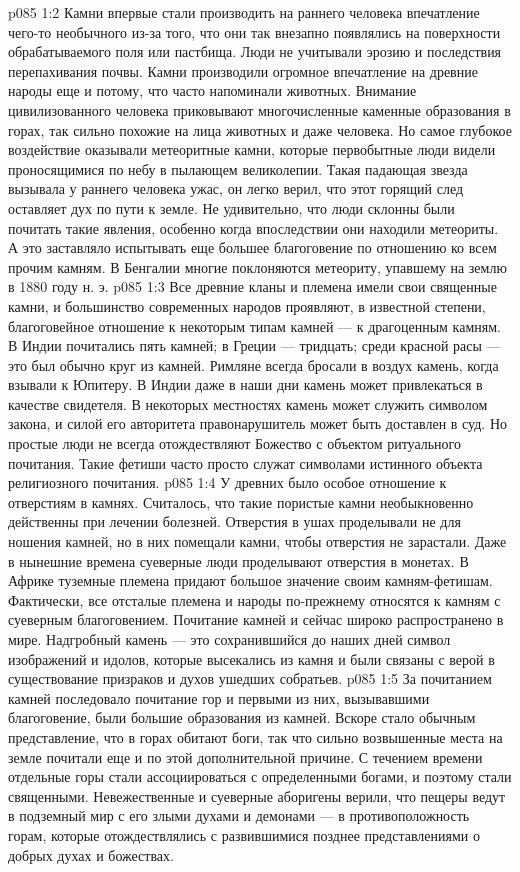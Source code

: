 \vs p085 1:2 Камни впервые стали производить на раннего человека впечатление чего\hyp{}то необычного из\hyp{}за того, что они так внезапно появлялись на поверхности обрабатываемого поля или пастбища. Люди не учитывали эрозию и последствия перепахивания почвы. Камни производили огромное впечатление на древние народы еще и потому, что часто напоминали животных. Внимание цивилизованного человека приковывают многочисленные каменные образования в горах, так сильно похожие на лица животных и даже человека. Но самое глубокое воздействие оказывали метеоритные камни, которые первобытные люди видели проносящимися по небу в пылающем великолепии. Такая падающая звезда вызывала у раннего человека ужас, он легко верил, что этот горящий след оставляет дух по пути к земле. Не удивительно, что люди склонны были почитать такие явления, особенно когда впоследствии они находили метеориты. А это заставляло испытывать еще большее благоговение по отношению ко всем прочим камням. В Бенгалии многие поклоняются метеориту, упавшему на землю в 1880 году н. э.
\vs p085 1:3 Все древние кланы и племена имели свои священные камни, и большинство современных народов проявляют, в известной степени, благоговейное отношение к некоторым типам камней --- к драгоценным камням. В Индии почитались пять камней; в Греции --- тридцать; среди красной расы --- это был обычно круг из камней. Римляне всегда бросали в воздух камень, когда взывали к Юпитеру. В Индии даже в наши дни камень может привлекаться в качестве свидетеля. В некоторых местностях камень может служить символом закона, и силой его авторитета правонарушитель может быть доставлен в суд. Но простые люди не всегда отождествляют Божество с объектом ритуального почитания. Такие фетиши часто просто служат символами истинного объекта религиозного почитания.
\vs p085 1:4 У древних было особое отношение к отверстиям в камнях. Считалось, что такие пористые камни необыкновенно действенны при лечении болезней. Отверстия в ушах проделывали не для ношения камней, но в них помещали камни, чтобы отверстия не зарастали. Даже в нынешние времена суеверные люди проделывают отверстия в монетах. В Африке туземные племена придают большое значение своим камням\hyp{}фетишам. Фактически, все отсталые племена и народы по\hyp{}прежнему относятся к камням с суеверным благоговением. Почитание камней и сейчас широко распространено в мире. Надгробный камень --- это сохранившийся до наших дней символ изображений и идолов, которые высекались из камня и были связаны с верой в существование призраков и духов ушедших собратьев.
\vs p085 1:5 За почитанием камней последовало почитание гор и первыми из них, вызывавшими благоговение, были большие образования из камней. Вскоре стало обычным представление, что в горах обитают боги, так что сильно возвышенные места на земле почитали еще и по этой дополнительной причине. С течением времени отдельные горы стали ассоциироваться с определенными богами, и поэтому стали священными. Невежественные и суеверные аборигены верили, что пещеры ведут в подземный мир с его злыми духами и демонами --- в противоположность горам, которые отождествлялись с развившимися позднее представлениями о добрых духах и божествах.
